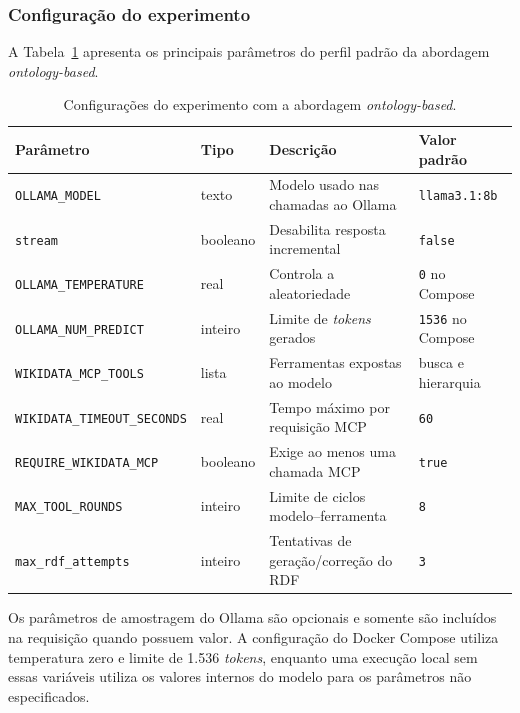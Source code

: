 \subsubsection{Configuração do experimento}

A Tabela~\ref{tab:config-ontology-based} apresenta os principais parâmetros do
perfil padrão da abordagem \textit{ontology-based}.

\begin{table}[htbp]
\centering
\caption{Configurações do experimento com a abordagem \textit{ontology-based}.}
\label{tab:config-ontology-based}
\small
\renewcommand{\arraystretch}{1.25}
\begin{tabular}{p{4.2cm}p{2.2cm}p{6.2cm}p{2.4cm}}
\toprule
\textbf{Parâmetro} & \textbf{Tipo} & \textbf{Descrição} & \textbf{Valor padrão} \\
\midrule
\texttt{OLLAMA\_MODEL} & texto & Modelo usado nas chamadas ao Ollama & \texttt{llama3.1:8b} \\
\texttt{stream} & booleano & Desabilita resposta incremental & \texttt{false} \\
\texttt{OLLAMA\_TEMPERATURE} & real & Controla a aleatoriedade & \texttt{0} no Compose \\
\texttt{OLLAMA\_NUM\_PREDICT} & inteiro & Limite de \textit{tokens} gerados & \texttt{1536} no Compose \\
\texttt{WIKIDATA\_MCP\_TOOLS} & lista & Ferramentas expostas ao modelo & busca e hierarquia \\
\texttt{WIKIDATA\_TIMEOUT\_SECONDS} & real & Tempo máximo por requisição MCP & \texttt{60} \\
\texttt{REQUIRE\_WIKIDATA\_MCP} & booleano & Exige ao menos uma chamada MCP & \texttt{true} \\
\texttt{MAX\_TOOL\_ROUNDS} & inteiro & Limite de ciclos modelo--ferramenta & \texttt{8} \\
\texttt{max\_rdf\_attempts} & inteiro & Tentativas de geração/correção do RDF & \texttt{3} \\
\bottomrule
\end{tabular}
\end{table}

Os parâmetros de amostragem do Ollama são opcionais e somente são incluídos na
requisição quando possuem valor. A configuração do Docker Compose utiliza
temperatura zero e limite de 1.536 \textit{tokens}, enquanto uma execução local
sem essas variáveis utiliza os valores internos do modelo para os parâmetros
não especificados.

